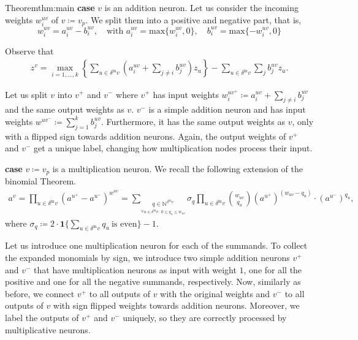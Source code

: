 \begin{proofref}{Theorem}{thm:main}
    \textbf{case} $v$ is an addition neuron.
        Let us consider the incoming weights $w^{uv}_i$ of $v \coloneqq v_p$. We split them into a positive and negative part, that is,
        $$
        w^{uv}_i = a^{uv}_i - b^{uv}_i, \quad \text{with } a^{uv}_i = \text{max} \{w^{uv}_i, 0\}, \quad b^{uv}_i = \text{max} \{-w^{uv}_i, 0\}
        $$
        
        Observe that
        \begin{align}
                z^v = \max_{i = 1, \dots, k} \left\{ \sum_{u \in \delta^{\text{in}} v} \left(a^{uv}_i + \sum_{j \neq i} b^{uv}_j \right) z_u \right\} - \sum_{u \in \delta^{\text{in}} v} \sum_{j} b^{uv}_j z_u \label{eq:addition_correct}.
        \end{align}
        
        Let us split $v$ into $v^+$ and $v^-$ where $v^+$ has input weights $w_i^{uv^+} \coloneqq a^{uv}_i + \sum_{j \neq i} b^{uv}_j$ and the same output weights as $v$.
        $v^-$ is a simple addition neuron and has input weights $w^{uv^-} \coloneqq\sum_{j=1}^k b^{uv}_j$. Furthermore, it has the same output weights as $v$, only with a flipped sign towards addition neurons.
        Again, the output weights of $v^+$ and $v^-$ get a unique label, changing how multiplication nodes process their input.

    \textbf{case} $v \coloneqq v_p$ is a multiplication neuron.
        We recall the following extension of the binomial Theorem.
        \begin{align}
            a^v = \prod_{u \in \delta^{\text{in}}v} (a^{u^+} - a^{u^-}) ^ {w^{uv}}
                = \sum_{\underset{\forall u \in  \delta^{\text{in}}v: \ 0 \leq q_u \leq w_{uv}}{q \in \mathbb{N}^{\delta^{\text{in}}v}}} \sigma_q \prod_{ u \in \delta^{\text{in}}v } \binom{w_{uv}}{q_u} (a^{u^+}) ^ {(w_{uv}-q_u)} \cdot (a^{u^-}) ^ {q_u} \label{eq:multiplication_correct},
        \end{align}
        where $\sigma_q \coloneqq 2 \cdot \mathbf{1} \{ \sum_{u \in \delta^{\text{in}}v} q_u \ \text{is even} \} - 1$.

        Let us introduce one multiplication neuron for each of the summands.
        To collect the expanded monomials by sign, we introduce two simple addition neurons $v^+$ and $v^-$ that have multiplication neurons as input with weight $1$, one for all the positive and one for all the negative summands, respectively.
        Now, similarly as before, we connect $v^+$ to all outputs of $v$ with the original weights and $v^-$ to all outputs of $v$ with sign flipped weights towards addition neurons. Moreover, we label the outputs of $v^+$ and $v^-$ uniquely, so they are correctly processed by multiplicative neurons.


\end{proofref}
